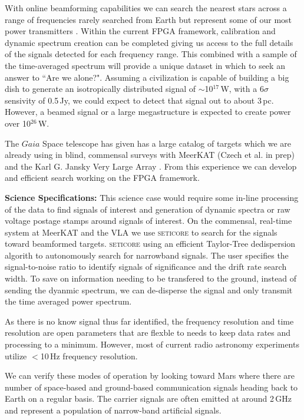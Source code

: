 With online beamforming capabilities we can search the nearest stars  across a range of frequencies rarely searched from Earth but represent some of our most power transmitters \citep{Tremblay_2022}. Within the current FPGA framework, calibration and dynamic spectrum creation can be completed giving us access to the full details of the signals detected for each frequency range. This combined with a sample of the time-averaged spectrum will provide a unique dataset in which to seek an answer to ``Are we alone?". Assuming a civilization is capable of building a big dish to generate an isotropically distributed signal of $\sim$10${^17}$\,W, with a 6$\sigma$ sensivity of 0.5\,Jy, we could expect to detect that signal out to about 3\,pc. However, a beamed signal or a large megastructure is expected to create power over 10$^{26}$\,W. 

The $Gaia$ Space telescope has given has a large catalog of targets which we are already using in blind, commensal surveys with MeerKAT (Czech et al. in prep) and the Karl G. Jansky Very Large Array \citep{Tremblay_2024}. From this experience we can develop and efficient search working on the FPGA framework.

\textbf{Science Specifications:} This science case would require some in-line processing of the data to find signals of interest and generation of dynamic spectra or raw voltage postage stamps around signals of interest. On the commensal, real-time system at MeerKAT and the VLA we use \textsc{seticore} to search for the signals toward beamformed targets. \textsc{seticore} using an efficient Taylor-Tree dedispersion algorith to autonomously search for narrowband signals. The user specifies the signal-to-noise ratio to identify signals of significance and the drift rate search width. To save on information needing to be transfered to the ground, instead of sending the dyanmic spectrum, we can de-disperse the signal and only transmit the time averaged power spectrum. 

As there is no know signal thus far identified, the frequency resolution and time resolution are open parameters that are flexble to needs to keep data rates and processing to a minimum. However, most of current radio astronomy experiments utilize $<$10\,Hz frequency resolution. 

We can verify these modes of operation by looking toward Mars where there are number of space-based and ground-based communication signals heading back to Earth on a regular basis. The carrier signals are often emitted at around 2\,GHz and represent a population of narrow-band artificial signals.

